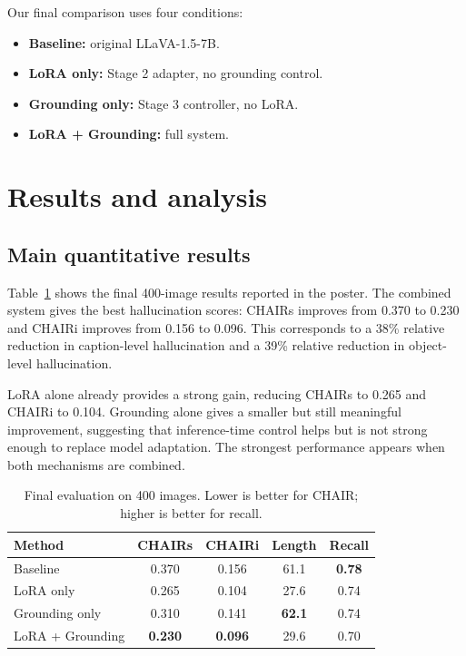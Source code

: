 \documentclass[10pt,twocolumn]{article}
\begin{document}
Our final comparison uses four conditions:
\begin{itemize}
  \item \textbf{Baseline:} original LLaVA-1.5-7B.
  \item \textbf{LoRA only:} Stage 2 adapter, no grounding control.
  \item \textbf{Grounding only:} Stage 3 controller, no LoRA.
  \item \textbf{LoRA + Grounding:} full system.
\end{itemize}

\section{Results and analysis}
\subsection{Main quantitative results}
Table~\ref{tab:main-results} shows the final 400-image results reported in the poster. The combined system gives the best hallucination scores: CHAIRs improves from 0.370 to 0.230 and CHAIRi improves from 0.156 to 0.096. This corresponds to a 38\% relative reduction in caption-level hallucination and a 39\% relative reduction in object-level hallucination.

LoRA alone already provides a strong gain, reducing CHAIRs to 0.265 and CHAIRi to 0.104. Grounding alone gives a smaller but still meaningful improvement, suggesting that inference-time control helps but is not strong enough to replace model adaptation. The strongest performance appears when both mechanisms are combined.

\begin{table}[t]
  \centering
  \caption{Final evaluation on 400 images. Lower is better for CHAIR; higher is better for recall.}
  \label{tab:main-results}
  \small
  \begin{tabular}{lcccc}
    \toprule
    Method & CHAIRs & CHAIRi & Length & Recall \\
    \midrule
    Baseline & 0.370 & 0.156 & 61.1 & \textbf{0.78} \\
    LoRA only & 0.265 & 0.104 & 27.6 & 0.74 \\
    Grounding only & 0.310 & 0.141 & \textbf{62.1} & 0.74 \\
    LoRA + Grounding & \textbf{0.230} & \textbf{0.096} & 29.6 & 0.70 \\
    \bottomrule
  \end{tabular}
\end{table}
\end{document}
